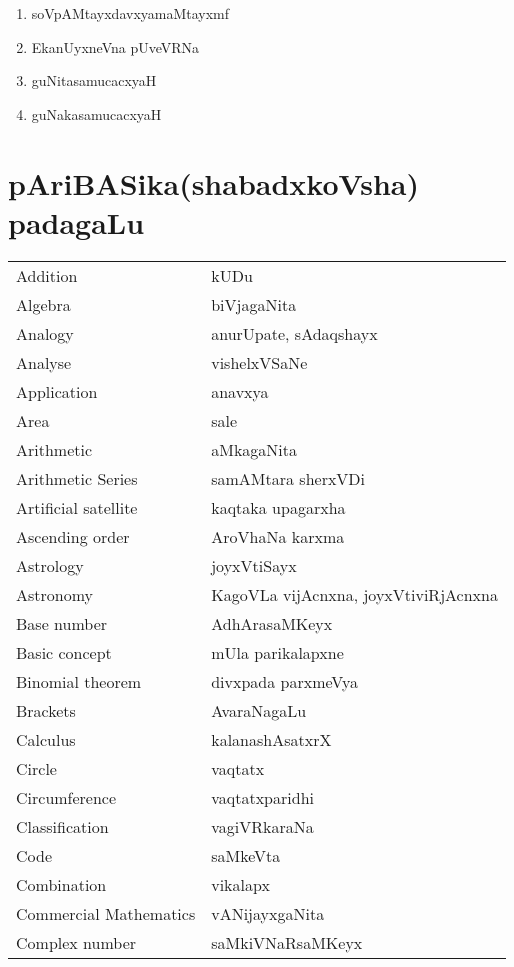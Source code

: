 {\begin{enumerate}[\rm 1)]
\item soVpAMtayxdavxyamaMtayxmf

\item EkanUyxneVna pUveVRNa

\item guNitasamucacxyaH

\item guNakasamucacxyaH
\end{enumerate}

\section*{pAriBASika(shabadxkoVsha) padagaLu}

\begin{longtable}{>{\rm}l@{\hspace{1cm}}l}
Addition & kUDu\\
Algebra & biVjagaNita\\
Analogy & anurUpate, sAdaqshayx\\
Analyse & vishelxVSaNe\\
Application & anavxya\\
Area & sale\\
Arithmetic & aMkagaNita\\
Arithmetic Series & samAMtara sherxVDi\\
Artificial satellite & kaqtaka upagarxha\\
Ascending order & AroVhaNa karxma\\
Astrology & joyxVtiSayx\\
Astronomy & KagoVLa vijAcnxna, joyxVtiviRjAcnxna\\
Base number & AdhArasaMKeyx\\
Basic concept & mUla parikalapxne\\
Binomial theorem & divxpada parxmeVya\\
Brackets &  AvaraNagaLu\\
Calculus & kalanashAsatxrX\\
Circle & vaqtatx\\
Circumference & vaqtatxparidhi\\
Classification & vagiVRkaraNa\\
Code & saMkeVta\\
Combination & vikalapx\\
Commercial Mathematics & vANijayxgaNita\\
Complex number & saMkiVNaRsaMKeyx\\

\end{longtable}}
